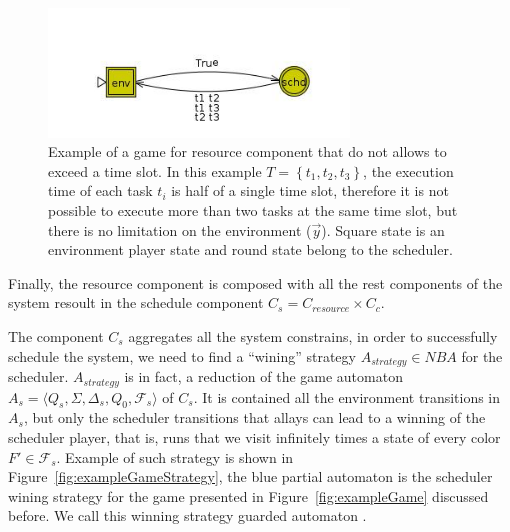\documentclass[ twoside, 12pt ]{article}
\begin{document}
\begin{figure} [h]
    \centerline{\includegraphics[width=80mm]{reasourceGame.jpg}}
    \caption{Example of a game for resource component that do not allows to exceed a time slot. 
        In this example $T = \left\{ t_1 , t_2 , t_3 \right\}$, the execution time of each task $t_i$ is half of a single time slot, therefore it is not possible to execute more than two tasks at the same time slot, but there is no limitation on the environment ($\vec{y}$).
        Square state is an environment player state and round state belong to the scheduler.  }
    \label{fig:C_resource}
\end{figure}

Finally, the resource component is composed with all the rest components of the system resoult in the schedule component $C_s = C_{resource} \times C_c$.

The component $C_s$ aggregates all the system constrains, in order to successfully schedule the system, we need to find a ``wining'' strategy $A_{strategy} \in NBA$ for the scheduler.
$A_{strategy}$ is in fact, a reduction of the game automaton $A_s = \langle Q_s ,\Sigma,\Delta_s, Q_0, \mathcal{F}_s \rangle$ of $C_s$. It is contained all the environment transitions in $A_s$, but only the scheduler transitions that allays can lead to a winning of the scheduler player, that is, runs that we visit infinitely times a state of every color $F' \in \mathcal{F}_s$.
Example of such strategy is shown in Figure~\ref{fig:exampleGameStrategy}, the blue partial automaton is the scheduler wining strategy for the game presented in Figure~\ref{fig:exampleGame} discussed before.
We call this winning strategy guarded automaton .
\end{document}
